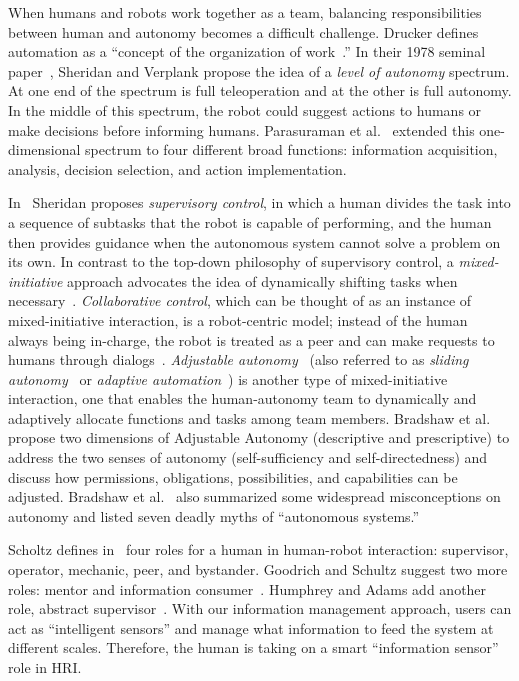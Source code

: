 When humans and robots work together as a team, balancing responsibilities between human and autonomy becomes a difficult challenge. Drucker defines automation as a ``concept of the organization of work~\cite{Drucker2006Practice}.'' In their 1978 seminal paper~\cite{Sheridan1978Human}, Sheridan and Verplank propose the idea of a \textit{level of autonomy} spectrum. At one end of the spectrum is full teleoperation and at the other is full autonomy. In the middle of this spectrum, the robot could suggest actions to humans or make decisions before informing humans. Parasuraman et al.\ \cite{Parasuraman2000Model} extended this one-dimensional spectrum to four different broad functions: information acquisition, analysis, decision selection, and action implementation. 

In~\cite{Sheridan1992Telerobotics} Sheridan proposes \textit{supervisory control}, in which a human divides the task into a sequence of subtasks that the robot is capable of performing, and the human then provides guidance when the autonomous system cannot solve a problem on its own. In contrast to the top-down philosophy of supervisory control, a \textit{mixed-initiative} approach advocates the idea of dynamically shifting tasks when necessary~\cite{Hearst1999Mixed}. \textit{Collaborative control}, which can be thought of as an instance of mixed-initiative interaction, is a robot-centric model; instead of the human always being in-charge, the robot is treated as a peer and can make requests to humans through dialogs~\cite{Fong1999Collaborative}. \textit{Adjustable autonomy}~\cite{Dorais2001Designing} (also referred to as \textit{sliding autonomy}~\cite{Dias2008SlidingAutonomy} or \textit{adaptive automation}~\cite{Rouse1988Adaptive}) is another type of mixed-initiative interaction, one that enables the human-autonomy team to dynamically and adaptively allocate functions and tasks among team members. Bradshaw et al.\ \cite{Bradshaw2004Dimensions} propose two dimensions of Adjustable Autonomy (descriptive  and prescriptive) to address the two senses of autonomy (self-sufficiency and self-directedness) and discuss how permissions, obligations, possibilities, and capabilities can be adjusted. Bradshaw et al.\ \cite{Bradshaw2013Seven} also summarized some widespread misconceptions on autonomy and listed seven deadly myths of ``autonomous systems.''

Scholtz defines in~\cite{Steinfeld2006Common} four roles for a human in human-robot interaction: supervisor, operator, mechanic, peer, and bystander. Goodrich and Schultz suggest two more roles: mentor and information consumer~\cite{Goodrich2007HRISurvey}. Humphrey and Adams add another role, abstract supervisor~\cite{Humphrey2009Information}. With our information management approach, users can act as ``intelligent sensors'' and manage what information to feed the system at different scales. Therefore, the human is taking on a smart ``information sensor'' role in HRI. 

